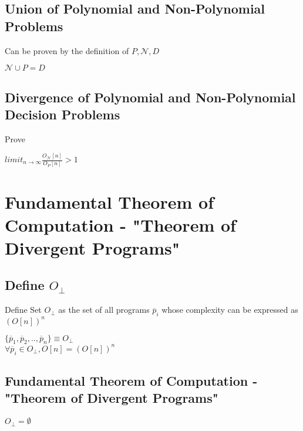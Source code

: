\documentclass[11pt]{article}
\begin{document}
\subsection{Union of Polynomial and Non-Polynomial Problems}
Can be proven by the definition of $P,\mathcal{N},D$
\begin{center}
$
\mathcal{N} \cup P = D
$
\end{center}


\subsection{Divergence of Polynomial and Non-Polynomial Decision Problems}
Prove
\begin{center}
$
limit _{n \to \infty} \frac{O_\mathcal{N}[n]}{O_P[n]} > 1
$
\end{center}





\section{Fundamental Theorem of Computation - "Theorem of Divergent Programs"}

\subsection{Define $O_\perp$}
Define Set $O_\perp$ as the set of all programs $\overline p_i$ whose complexity can be expressed as $(O[n])^n$
\begin{center}

\vspace{2mm}
$
\{\overline p_1,\overline p_2,..,\overline p_n\} \equiv O_\perp
$
\\ \vspace{2mm}
$
\forall \overline p_i \in O_\perp, O[n] = (O[n])^n
$
\end{center}

\subsection{Fundamental Theorem of Computation - "Theorem of Divergent Programs"}
\begin{center}
\vspace{2mm}
$
O_\perp = \emptyset
$
\end{center}
\end{document}
